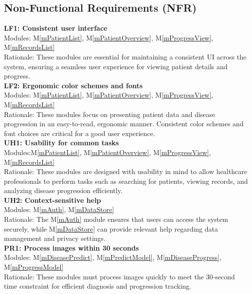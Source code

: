 \documentclass[12pt, titlepage]{article}
\newcommand{\mref}[1]{M\ref{#1}}
\begin{document}
\subsection{Non-Functional Requirements (NFR)}
\textbf{LF1: Consistent user interface} \\
Modules: \mref{mPatientList}, \mref{mPatientOverview}, \mref{mProgressView}, \mref{mRecordsList} \\
Rationale: These modules are essential for maintaining a consistent UI across the system, ensuring a seamless user experience for viewing patient details and progress. \\
\newline
\textbf{LF2: Ergonomic color schemes and fonts} \\
Modules: \mref{mPatientList}, \mref{mPatientOverview}, \mref{mProgressView}, \mref{mRecordsList} \\
Rationale: These modules focus on presenting patient data and disease progression in an easy-to-read, ergonomic manner. Consistent color schemes and font choices are critical for a good user experience. \\
\newline
\textbf{UH1: Usability for common tasks} \\
Modules:\mref{mPatientList}, \mref{mPatientOverview}, \mref{mProgressView}, \mref{mRecordsList}\\
Rationale: These modules are designed with usability in mind to allow healthcare professionals to perform tasks such as searching for patients, viewing records, and analyzing disease progression efficiently. \\
\newline
\textbf{UH2: Context-sensitive help} \\
Modules: \mref{mAuth}, \mref{mDataStore} \\
Rationale: The \mref{mAuth} module ensures that users can access the system securely, while \mref{mDataStore} can provide relevant help regarding data management and privacy settings. \\
\newline
\textbf{PR1: Process images within 30 seconds} \\
Modules: \mref{mDiseasePredict}, \mref{mPredictModel}, \mref{mDiseaseProgress}, \mref{mProgressModel} \\
Rationale: These modules must process images quickly to meet the 30-second time constraint for efficient diagnosis and progression tracking. \\
\newline
\end{document}
